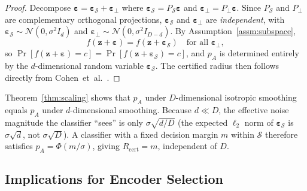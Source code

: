 \begin{proof}
Decompose
$\boldsymbol{\varepsilon} = \boldsymbol{\varepsilon}_\mathcal{S}
+ \boldsymbol{\varepsilon}_\perp$
where
$\boldsymbol{\varepsilon}_\mathcal{S} = P_\mathcal{S}\boldsymbol{\varepsilon}$
and
$\boldsymbol{\varepsilon}_\perp = P_\perp\boldsymbol{\varepsilon}$.
Since $P_\mathcal{S}$ and $P_\perp$ are complementary orthogonal
projections,
$\boldsymbol{\varepsilon}_\mathcal{S}$ and
$\boldsymbol{\varepsilon}_\perp$ are \emph{independent},
with
$\boldsymbol{\varepsilon}_\mathcal{S} \sim \mathcal{N}(0,\sigma^2 I_d)$
and
$\boldsymbol{\varepsilon}_\perp \sim \mathcal{N}(0,\sigma^2 I_{D-d})$.
By Assumption~\ref{assm:subspace},
\begin{equation}
  f(\mathbf{z}+\boldsymbol{\varepsilon})
    = f(\mathbf{z}+\boldsymbol{\varepsilon}_\mathcal{S})
  \quad \text{for all } \boldsymbol{\varepsilon}_\perp,
  \label{eq:proof_step}
\end{equation}
so
$\Pr[f(\mathbf{z}+\boldsymbol{\varepsilon})=c]
 = \Pr[f(\mathbf{z}+\boldsymbol{\varepsilon}_\mathcal{S})=c]$,
and $p_A$ is determined entirely by the $d$-dimensional
random variable $\boldsymbol{\varepsilon}_\mathcal{S}$.
The certified radius then follows directly from
Cohen~et~al.~\cite{cohen2019certified}.
\end{proof}

\begin{remark}
\label{rem:pA_unchanged}
Theorem~\ref{thm:scaling} shows that $p_A$ under $D$-dimensional
isotropic smoothing equals $p_A$ under $d$-dimensional smoothing.
Because $d \ll D$, the effective noise magnitude the classifier
``sees'' is only $\sigma\sqrt{d/D}$ (the expected $\ell_2$ norm
of $\boldsymbol{\varepsilon}_\mathcal{S}$ is $\sigma\sqrt{d}$,
not $\sigma\sqrt{D}$).
A classifier with a fixed decision margin $m$ within $\mathcal{S}$
therefore satisfies $p_A = \Phi(m/\sigma)$, giving
$R_\text{cert} = m$, independent of $D$.
\end{remark}

\subsection{Implications for Encoder Selection}
\label{sec:theory:corollary}


